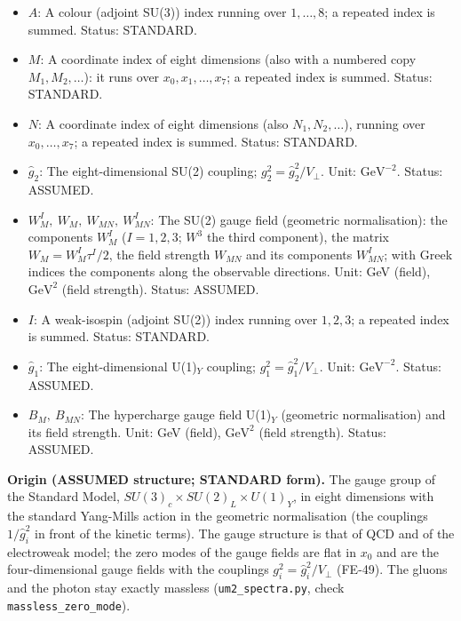 \documentclass[
  10pt,
]{article}
\begin{document}
\begin{itemize}
  kinetic terms): the components \(G^A_M\) (\(A = 1, \dots, 8\)), the
  matrix \(G_M = G^A_Mt^A\), the field strength \(G_{MN}\) (matrix) and
  its components \(G^A_{MN}\); \(G^A_{\mu\nu}\) are its components along
  the observable directions (the zero mode, flat in \(x_0\)). Unit: GeV
  (field), \(\mathrm{GeV}^{2}\) (field strength). Status: ASSUMED.
\item
  \(A\): A colour (adjoint SU(3)) index running over \(1, \dots, 8\); a
  repeated index is summed. Status: STANDARD.
\item
  \(M\): A coordinate index of eight dimensions (also with a numbered
  copy \(M_1, M_2, \dots\)): it runs over \(x_0, x_1, \dots, x_7\); a
  repeated index is summed. Status: STANDARD.
\item
  \(N\): A coordinate index of eight dimensions (also
  \(N_1, N_2, \dots\)), running over \(x_0, \dots, x_7\); a repeated
  index is summed. Status: STANDARD.
\item
  \(\hat g_2\): The eight-dimensional SU(2) coupling;
  \(g_2^2 = \hat g_2^2/V_\perp\). Unit: \(\mathrm{GeV}^{-2}\). Status:
  ASSUMED.
\item
  \(W^I_M,\ W_M,\ W_{MN},\ W^I_{MN}\): The SU(2) gauge field (geometric
  normalisation): the components \(W^I_M\) (\(I = 1, 2, 3\); \(W^3\) the
  third component), the matrix \(W_M = W^I_M\tau^I/2\), the field
  strength \(W_{MN}\) and its components \(W^I_{MN}\); with Greek
  indices the components along the observable directions. Unit: GeV
  (field), \(\mathrm{GeV}^{2}\) (field strength). Status: ASSUMED.
\item
  \(I\): A weak-isospin (adjoint SU(2)) index running over \(1, 2, 3\);
  a repeated index is summed. Status: STANDARD.
\item
  \(\hat g_1\): The eight-dimensional U(1)\(_Y\) coupling;
  \(g_1^2 = \hat g_1^2/V_\perp\). Unit: \(\mathrm{GeV}^{-2}\). Status:
  ASSUMED.
\item
  \(B_M,\ B_{MN}\): The hypercharge gauge field U(1)\(_Y\) (geometric
  normalisation) and its field strength. Unit: GeV (field),
  \(\mathrm{GeV}^{2}\) (field strength). Status: ASSUMED.
\end{itemize}

\textbf{Origin (ASSUMED structure; STANDARD form).} The gauge group of
the Standard Model, \(SU(3)_c\times SU(2)_L\times U(1)_Y\), in eight
dimensions with the standard Yang-Mills action in the geometric
normalisation (the couplings \(1/\hat g_i^2\) in front of the kinetic
terms). The gauge structure is that of QCD and of the electroweak model;
the zero modes of the gauge fields are flat in \(x_0\) and are the
four-dimensional gauge fields with the couplings
\(g_i^2 = \hat g_i^2/V_\perp\) (FE-49). The gluons and the photon stay
exactly massless (\texttt{um2\_spectra.py}, check
\texttt{massless\_zero\_mode}).
\end{document}
